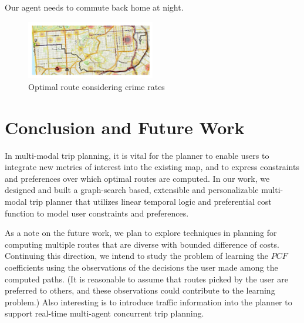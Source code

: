 \documentclass[letterpaper]{article}
\newcommand{\PCF}{\mathit{PCF}}
\begin{document}
Our agent needs to commute back home at night.

\begin{figure}[!ht]
  \centering
    \includegraphics[width=0.5\textwidth]{figs/crime.pdf}
  \caption{Optimal route considering crime rates\label{fig:crime}}
\end{figure}



\section{Conclusion and Future Work}
In multi-modal trip planning, it is vital for the planner to enable
users to integrate new metrics of interest into the existing map,
and to express constraints and preferences over which optimal
routes are computed.
In our work, we designed and built a graph-search based, extensible
and personalizable multi-modal trip planner that utilizes linear
temporal logic and preferential cost
function to model user constraints and preferences.

As a note on the future work, we plan to explore techniques in planning
for computing multiple routes that are diverse with bounded difference of costs.
Continuing this direction, we intend to study the problem of learning the
$\PCF$ coefficients using the observations of the decisions the user made among
the computed paths. (It is reasonable to assume that routes picked by the user
are preferred to others, and these observations could contribute to the learning
problem.)
Also interesting is to introduce traffic information into the planner
to support real-time multi-agent concurrent trip planning.




\end{document}
